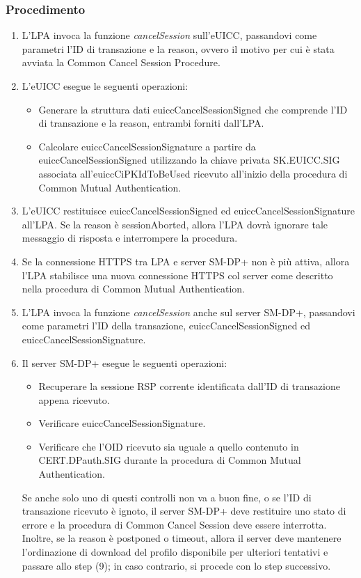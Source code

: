 \documentclass[10pt, oneside]{book}
\begin{document}
\subsubsection{Procedimento}
\begin{enumerate}
\item L'LPA invoca la funzione \textit{cancelSession} sull'eUICC, passandovi come parametri l'ID di transazione e la reason, ovvero il motivo per cui è stata avviata la Common Cancel Session Procedure.
\item L'eUICC esegue le seguenti operazioni:
\begin{itemize}[itemsep=0pt]
\item Generare la struttura dati euiccCancelSessionSigned che comprende l'ID di transazione e la reason, entrambi forniti dall'LPA.
\item Calcolare euiccCancelSessionSignature a partire da euiccCancelSessionSigned utilizzando la chiave privata SK.EUICC.SIG associata all'euiccCiPKIdToBeUsed ricevuto all'inizio della procedura di Common Mutual Authentication.
\end{itemize}
\item L'eUICC restituisce euiccCancelSessionSigned ed euiccCancelSessionSignature all'LPA. Se la reason è sessionAborted, allora l'LPA dovrà ignorare tale messaggio di risposta e interrompere la procedura.
\item Se la connessione HTTPS tra LPA e server SM-DP+ non è più attiva, allora l'LPA stabilisce una nuova connessione HTTPS col server come descritto nella procedura di Common Mutual Authentication.
\item L'LPA invoca la funzione \textit{cancelSession} anche sul server SM-DP+, passandovi come parametri l'ID della transazione, euiccCancelSessionSigned ed euiccCancelSessionSignature.
\item Il server SM-DP+ esegue le seguenti operazioni:
\begin{itemize}[itemsep=0pt]
\item Recuperare la sessione RSP corrente identificata dall'ID di transazione appena ricevuto.
\item Verificare euiccCancelSessionSignature.
\item Verificare che l'OID ricevuto sia uguale a quello contenuto in CERT.DPauth.SIG durante la procedura di Common Mutual Authentication.
\end{itemize}
Se anche solo uno di questi controlli non va a buon fine, o se l'ID di transazione ricevuto è ignoto, il server SM-DP+ deve restituire uno stato di errore e la procedura di Common Cancel Session deve essere interrotta. Inoltre, se la reason è postponed o timeout, allora il server deve mantenere l'ordinazione di download del profilo disponibile per ulteriori tentativi e passare allo step (9); in caso contrario, si procede con lo step successivo.

\end{enumerate}
\end{document}
